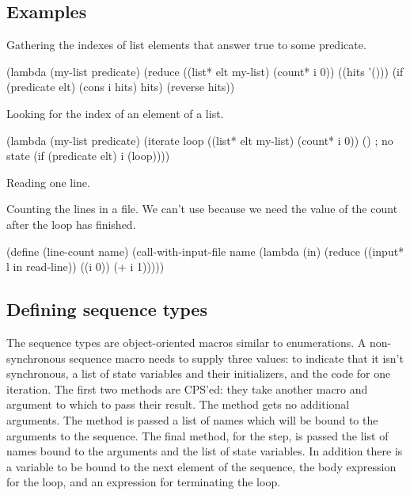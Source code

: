 \subsection{Examples}

\noindent
Gathering the indexes of list elements that answer true to some
predicate.
\begin{example}
(lambda (my-list predicate)
  (reduce ((list* elt my-list)
           (count* i 0))
          ((hits '()))
    (if (predicate elt)
        (cons i hits)
        hits)
    (reverse hits))
\end{example}

\noindent
Looking for the index of an element of a list.
\begin{example}
(lambda (my-list predicate)
  (iterate loop
           ((list* elt my-list)
            (count* i 0))
           ()                                ; no state
    (if (predicate elt)
        i
        (loop))))
\end{example}

\noindent
Reading one line.

\noindent
Counting the lines in a file.  We can't use  because we
need the value of the count after the loop has finished.
\begin{example}
(define (line-count name)
  (call-with-input-file name
    (lambda (in)
      (reduce ((input* l in read-line))
              ((i 0))
        (+ i 1)))))
\end{example}

\subsection{Defining sequence types}

The sequence types are object-oriented macros similar to enumerations.
A non-synchronous sequence macro needs to supply three values:
  to indicate that it isn't synchronous, a list of state variables
 and their initializers, and the code for one iteration.
The first
 two methods are CPS'ed: they take another macro and argument to
 which to pass their result.
The  method gets no additional arguments.
The  method is passed a list of names which
 will be bound to the arguments to the sequence.
The final method, for the step, is passed the list of names bound to
 the arguments and the list of state variables.
In addition there is
 a variable to be bound to the next element of the sequence, the
 body expression for the loop, and an expression for terminating the
 loop.

